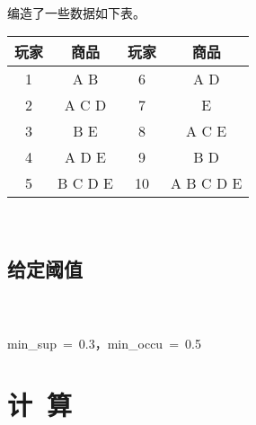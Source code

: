 \documentclass{article}
\begin{document}
		\paragraph{\ \ } 编造了一些数据如下表。
		\begin{center}
			\begin{tabular}{|c|c||c|c|}
				\hline
				玩家 & 商品 & 玩家 & 商品\\
				\hline
				1 & A B & 6 & A D\\
				\hline
				2 & A C D & 7 & E\\
				\hline
				3 & B E & 8 & A C E\\
				\hline
				4 & A D E & 9 & B D\\
				\hline
				5 & B C D E & 10 & A B C D E\\
				\hline
			\end{tabular}\\[1em]
		\end{center}
		\subsection{给定阈值} 
		\paragraph{\ \ } min\_sup\ =\ 0.3，min\_occu\ =\ 0.5
	\section{计\ 算}
\end{document}
